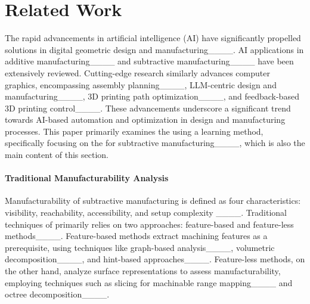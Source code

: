 \section{Related Work}
\label{sec:related}

 

The rapid advancements in artificial intelligence (AI) have significantly propelled solutions in digital geometric design and manufacturing____. 
AI applications in additive manufacturing____ and subtractive manufacturing____ have been extensively reviewed.
Cutting-edge research similarly advances computer graphics, encompassing assembly planning____, LLM-centric design and manufacturing____, 3D printing path optimization____, and feedback-based 3D printing control____.
%
These advancements underscore a significant trend towards AI-based automation and optimization in design and manufacturing processes.
This paper primarily examines the \manuAna using a learning method, specifically focusing on the \accessAna for subtractive manufacturing____, which is also the main content of this section.



\paragraph{Traditional Manufacturability Analysis}


Manufacturability of subtractive manufacturing is defined as four characteristics: visibility, reachability, accessibility, and setup complexity ____.
%
Traditional techniques of \manuAna primarily relies on two approaches: feature-based and feature-less methods____. Feature-based methods extract machining features as a prerequisite, using techniques like graph-based analysis____, volumetric decomposition____, and hint-based approaches____. Feature-less methods, on the other hand, analyze surface representations to assess manufacturability, employing techniques such as slicing for machinable range mapping____ and octree decomposition____.



